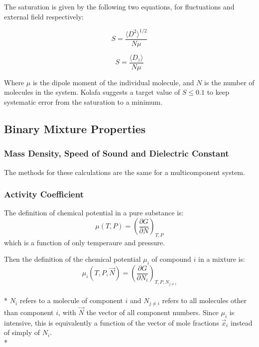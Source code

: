 \documentclass[aps,pre,twocolumn,nofootinbib,superscriptaddress,linenumbers,10pt, draft,tightenlines]{revtex4-1}
\begin{document}
The saturation is given by the following two equations, for fluctuations and external field respectively:

\begin{equation} S= \frac{\langle D^2 \rangle^{1/2}}{N\mu} \end{equation}

\begin{equation} S = \frac{\langle D_z \rangle}{N\mu} \end{equation}

Where $\mu$ is the dipole moment of the individual molecule, and $N$ is the number of molecules in the system. Kolafa suggests a target value of $ S \leq 0.1$ to keep systematic error from the saturation to a minimum.



\subsection{Binary Mixture Properties} 
\subsubsection{Mass Density, Speed of Sound and Dielectric Constant}
The methods for these calculations are the same for a multicomponent system.


\subsubsection{Activity Coefficient}
The definition of chemical potential in a pure substance is:
\begin{equation}\mu(T,P) = \left(\frac{\partial G}{\partial N}\right)_{T,P}\end{equation}
which is a function of only temperaure and pressure.

Then the definition of the chemical potential $\mu_i$ of compound $i$ in a mixture is:
\begin{equation}\mu_{i}(T,P,\vec{N}) = \left(\frac{\partial G}{\partial N_{i}}\right)_{T,P,N_{j \neq i}}\end{equation}\\*
$N_i$ refers to a molecule of component $i$ and $N_{j \neq i}$ refers
to all molecules other than component $i$, with $\vec{N}$ the vector
of all component numbers. Since $\mu_i$ is intensive, this is
equivalently a function of the vector of mole fractions $\vec{x}_i$ instead of simply of $N_i$.\\*
\end{document}
